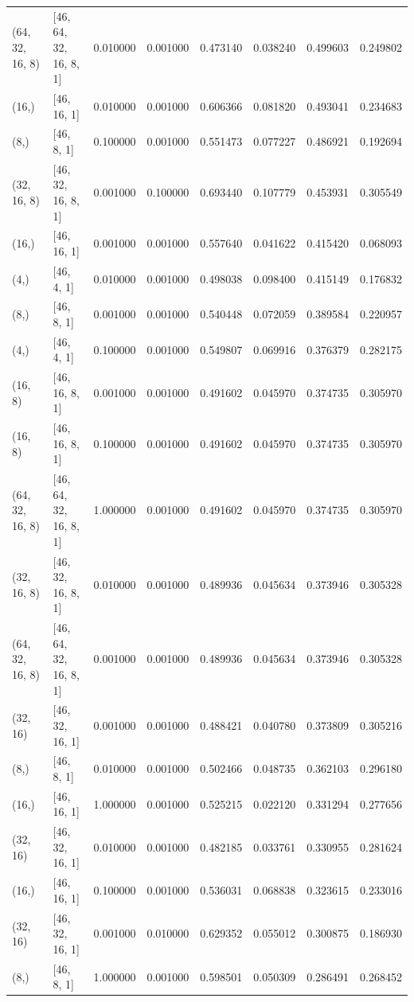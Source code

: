 \documentclass{article}
\begin{document}
\begin{longtable}{llrrrrrr}
(64, 32, 16, 8) & [46, 64, 32, 16, 8, 1] & 0.010000 & 0.001000 & 0.473140 & 0.038240 & 0.499603 & 0.249802 \\
(16,) & [46, 16, 1] & 0.010000 & 0.001000 & 0.606366 & 0.081820 & 0.493041 & 0.234683 \\
(8,) & [46, 8, 1] & 0.100000 & 0.001000 & 0.551473 & 0.077227 & 0.486921 & 0.192694 \\
(32, 16, 8) & [46, 32, 16, 8, 1] & 0.001000 & 0.100000 & 0.693440 & 0.107779 & 0.453931 & 0.305549 \\
(16,) & [46, 16, 1] & 0.001000 & 0.001000 & 0.557640 & 0.041622 & 0.415420 & 0.068093 \\
(4,) & [46, 4, 1] & 0.010000 & 0.001000 & 0.498038 & 0.098400 & 0.415149 & 0.176832 \\
(8,) & [46, 8, 1] & 0.001000 & 0.001000 & 0.540448 & 0.072059 & 0.389584 & 0.220957 \\
(4,) & [46, 4, 1] & 0.100000 & 0.001000 & 0.549807 & 0.069916 & 0.376379 & 0.282175 \\
(16, 8) & [46, 16, 8, 1] & 0.001000 & 0.001000 & 0.491602 & 0.045970 & 0.374735 & 0.305970 \\
(16, 8) & [46, 16, 8, 1] & 0.100000 & 0.001000 & 0.491602 & 0.045970 & 0.374735 & 0.305970 \\
(64, 32, 16, 8) & [46, 64, 32, 16, 8, 1] & 1.000000 & 0.001000 & 0.491602 & 0.045970 & 0.374735 & 0.305970 \\
(32, 16, 8) & [46, 32, 16, 8, 1] & 0.010000 & 0.001000 & 0.489936 & 0.045634 & 0.373946 & 0.305328 \\
(64, 32, 16, 8) & [46, 64, 32, 16, 8, 1] & 0.001000 & 0.001000 & 0.489936 & 0.045634 & 0.373946 & 0.305328 \\
(32, 16) & [46, 32, 16, 1] & 0.001000 & 0.001000 & 0.488421 & 0.040780 & 0.373809 & 0.305216 \\
(8,) & [46, 8, 1] & 0.010000 & 0.001000 & 0.502466 & 0.048735 & 0.362103 & 0.296180 \\
(16,) & [46, 16, 1] & 1.000000 & 0.001000 & 0.525215 & 0.022120 & 0.331294 & 0.277656 \\
(32, 16) & [46, 32, 16, 1] & 0.010000 & 0.001000 & 0.482185 & 0.033761 & 0.330955 & 0.281624 \\
(16,) & [46, 16, 1] & 0.100000 & 0.001000 & 0.536031 & 0.068838 & 0.323615 & 0.233016 \\
(32, 16) & [46, 32, 16, 1] & 0.001000 & 0.010000 & 0.629352 & 0.055012 & 0.300875 & 0.186930 \\
(8,) & [46, 8, 1] & 1.000000 & 0.001000 & 0.598501 & 0.050309 & 0.286491 & 0.268452 \\

\end{longtable}
\end{document}
